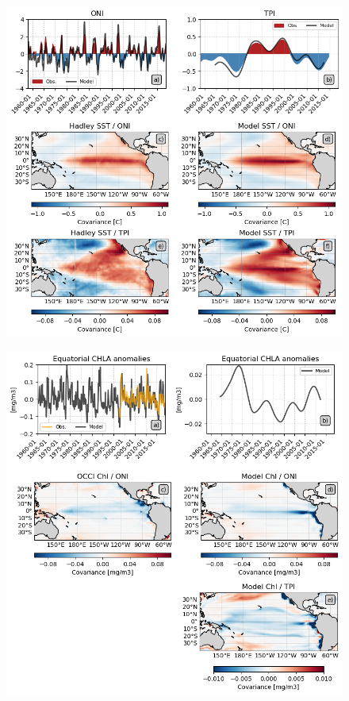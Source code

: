 \begin{figure}[h!]
	\centering
	\includegraphics[scale=0.75] {scripts/final_figs/fig1/fig1.png}
	\label{fig:cov-sst}
\end{figure}

\begin{figure}[h!]
	\centering
	\includegraphics[scale=0.75] {scripts/final_figs/fig2/fig2.png}
	\label{fig:cov-chl}
\end{figure}

